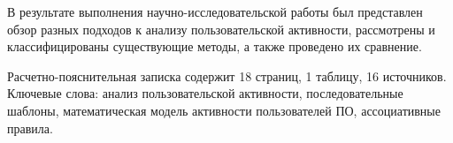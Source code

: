 
В результате выполнения научно-исследовательской работы был представлен обзор разных подходов к анализу пользовательской активности, рассмотрены и классифицированы существующие методы, а также проведено их сравнение.

Расчетно-пояснительная записка содержит 18 страниц, 1 таблицу, 16 источников. Ключевые слова: анализ пользовательской активности, последовательные шаблоны, математическая модель активности пользователей ПО, ассоциативные правила.

%
%
%

%
